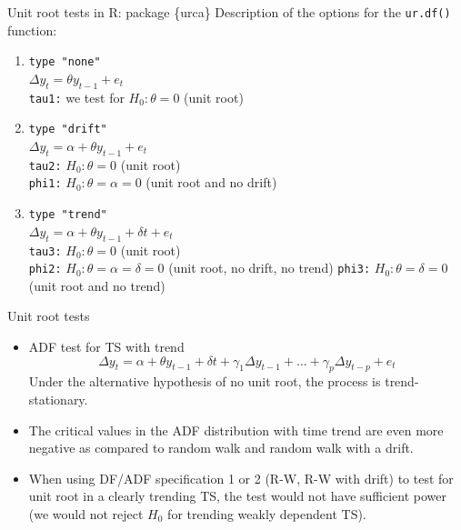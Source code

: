 \documentclass{beamer}
\begin{document}
\begin{frame}{Unit root tests in R: package \{urca\}}
Description of the options for the \texttt{ur.df()} function:
\medskip
\begin{enumerate}
\item \texttt{type "none"} \\
$\Delta y_t = \theta y_{t-1} + e_t$ ~\\
\texttt{tau1:} we test for $H_0: \theta = 0$ (unit root) 
\medskip
\item \texttt{type "drift"} \\
$\Delta y_t = \alpha + \theta y_{t-1} + e_t$ ~\\
\texttt{tau2:} $H_0: \theta = 0$ (unit root) \\
\texttt{phi1:} $H_0: \theta = \alpha = 0$ (unit root and no drift) 

\medskip
\item \texttt{type "trend"} \\
$\Delta y_t = \alpha + \theta y_{t-1} + \delta t + e_t$ ~\\
\texttt{tau3:} $H_0: \theta = 0$ (unit root) \\
\texttt{phi2:} $H_0: \theta = \alpha = \delta = 0$ (unit root, no drift, no trend) 
\texttt{phi3:} $H_0: \theta = \delta = 0$ (unit root and no trend) 

\end{enumerate}
\end{frame}


\begin{frame}{Unit root tests}
\begin{itemize}
\item ADF test for TS with trend
$$ \Delta y_t = \alpha  + \theta y_{t-1} + \delta t + \gamma_1\Delta y_{t-1}+\dots+\gamma_p\Delta y_{t-p}+e_t$$
Under the alternative hypothesis of no unit root, the process is trend-stationary.
\medskip
\item The critical values in the ADF distribution with time trend are even more negative as compared to random walk and random walk with a drift.
\medskip
\item When using DF/ADF specification 1 or 2 (R-W, R-W with drift) to test for unit root in a clearly trending TS, the test would not have sufficient power (we would not reject $H_0$ for trending weakly dependent TS).
\end{itemize}
\end{frame}
\end{document}
